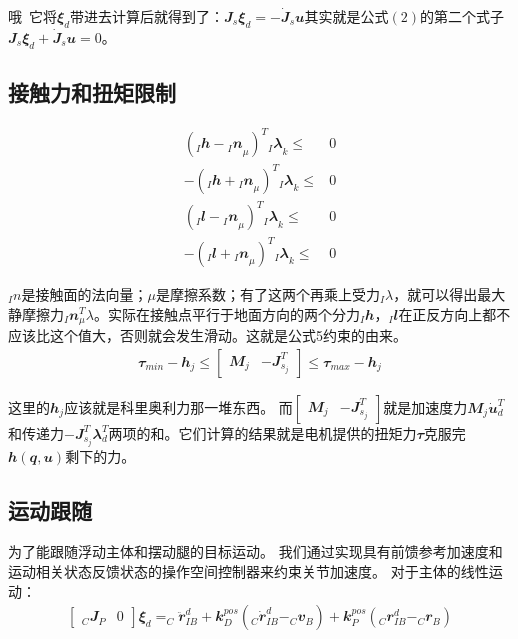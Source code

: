 哦~它将${\mathbfit \xi}_d$带进去计算后就得到了：${\mathbfit J}_s  {\mathbfit \xi}_d  = - \dot {\mathbfit J}_s {\mathbfit u}$其实就是公式$(2)$的第二个式子${\mathbfit J}_s  {\mathbfit \xi}_d  + \dot {\mathbfit J}_s {\mathbfit u} = 0$。

\subsection{接触力和扭矩限制}

\begin{align}
(_I{\mathbfit h} - {_I{\mathbfit n}}_{\mu})^T {_I{\mathbfit \lambda}}_k\leq & 0 \\
- (_I{\mathbfit h} + {_I{\mathbfit n}}_{\mu})^T {_I{\mathbfit \lambda}}_k\leq & 0 \\
(_I{\mathbfit l} - {_I{\mathbfit n}}_{\mu})^T {_I{\mathbfit \lambda}}_k\leq & 0 \\
- (_I{\mathbfit l} + {_I{\mathbfit n}}_{\mu})^T {_I{\mathbfit \lambda}}_k\leq & 0
\end{align}

$_In$是接触面的法向量；$\mu$是摩擦系数；有了这两个再乘上受力$_I\lambda$，就可以得出最大静摩擦力$_I{\mathbfit n}_{\mu}^T \lambda$。实际在接触点平行于地面方向的两个分力$_I{\mathbfit h}$，$_I{\mathbfit l}$在正反方向上都不应该比这个值大，否则就会发生滑动。这就是公式5约束的由来。
\begin{align}
    {\mathbfit \tau}_{min}-{\mathbfit h}_j 
    \leq \begin{bmatrix} {\mathbfit M}_j & -{\mathbfit J}^T_{s_j} \end{bmatrix} 
    \leq {\mathbfit \tau}_{max}-{\mathbfit h}_j 
\end{align}

这里的${\mathbfit h}_j$应该就是科里奥利力那一堆东西。
而$\begin{bmatrix} {\mathbfit M}_j & -{\mathbfit J}^T_{s_j} \end{bmatrix}$就是加速度力${\mathbfit M}_j  \dot{\mathbfit u}_d^T$和传递力$-{\mathbfit J}^T_{s_j} {\mathbfit \lambda}_d^T$两项的和。它们计算的结果就是电机提供的扭矩力${\mathbfit \tau}$克服完${\mathbfit h}({\mathbfit q}, {\mathbfit u})$剩下的力。

\subsection{运动跟随}
为了能跟随浮动主体和摆动腿的目标运动。
我们通过实现具有前馈参考加速度和运动相关状态反馈状态的操作空间控制器来约束关节加速度。
对于主体的线性运动：
\begin{align}
    \begin{bmatrix}
    _C{\mathbfit J}_P & {\mathbfit 0}
    \end{bmatrix} 
    {\mathbfit \xi}_d = _C\ddot {\mathbfit r}_{IB}^d 
    + {\mathbfit k}_D^{pos}(_C \dot{\mathbfit r}_{IB}^d-_C{\mathbfit v}_B) 
    + {\mathbfit k}_P^{pos}(_C{\mathbfit r}_{IB}^d-_C{\mathbfit r}_B)
\end{align}

